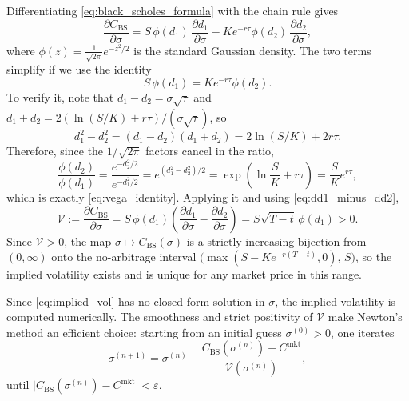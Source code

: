 Differentiating \eqref{eq:black_scholes_formula} with the chain rule gives
\begin{equation*}
    \frac{\partial C_{\mathrm{BS}}}{\partial \sigma}
        = S\,\phi(d_1)\,\frac{\partial d_1}{\partial \sigma}
          - K e^{-r\tau}\phi(d_2)\,\frac{\partial d_2}{\partial \sigma},
\end{equation*}
where $\phi(z) = \frac{1}{\sqrt{2\pi}}e^{-z^2/2}$ is the standard Gaussian density.
The two terms simplify if we use the identity
\begin{equation}\label{eq:vega_identity}
    S\,\phi(d_1) = K e^{-r\tau}\phi(d_2).
\end{equation}
To verify it, note that $d_1 - d_2 = \sigma\sqrt{\tau}$ and $d_1 + d_2 = 2(\ln(S/K) + r\tau)/(\sigma\sqrt{\tau})$,
so
\begin{equation*}
    d_1^2 - d_2^2 = (d_1 - d_2)(d_1 + d_2) = 2\ln(S/K) + 2r\tau.
\end{equation*}
Therefore, since the $1/\sqrt{2\pi}$ factors cancel in the ratio,
\begin{equation*}
    \frac{\phi(d_2)}{\phi(d_1)}
        = \frac{e^{-d_2^2/2}}{e^{-d_1^2/2}}
        = e^{(d_1^2 - d_2^2)/2}
        = \exp\!\left(\ln\frac{S}{K} + r\tau\right)
        = \frac{S}{K}e^{r\tau},
\end{equation*}
which is exactly \eqref{eq:vega_identity}.
Applying it and using \eqref{eq:dd1_minus_dd2},
\begin{equation}\label{eq:bs_vega}
    \mathcal{V} := \frac{\partial C_{\mathrm{BS}}}{\partial \sigma}
        = S\,\phi(d_1)
          \left(\frac{\partial d_1}{\partial \sigma} - \frac{\partial d_2}{\partial \sigma}\right)
        = S\sqrt{T - t}\,\phi(d_1) > 0.
\end{equation}
Since $\mathcal{V} > 0$, the map $\sigma \mapsto C_{\mathrm{BS}}(\sigma)$ is a strictly increasing bijection
from $(0, \infty)$ onto the no-arbitrage interval
$\bigl(\max(S - Ke^{-r(T-t)}, 0),\, S\bigr)$,
so the implied volatility exists and is unique for any market price in this range.

Since \eqref{eq:implied_vol} has no closed-form solution in $\sigma$,
the implied volatility is computed numerically.
The smoothness and strict positivity of $\mathcal{V}$ make Newton's method an efficient choice:
starting from an initial guess $\sigma^{(0)} > 0$, one iterates
\begin{equation}\label{eq:newton_iv}
    \sigma^{(n+1)} = \sigma^{(n)} - \frac{C_{\mathrm{BS}}(\sigma^{(n)}) - C^{\mathrm{mkt}}}{\mathcal{V}(\sigma^{(n)})},
\end{equation}
until $\lvert C_{\mathrm{BS}}(\sigma^{(n)}) - C^{\mathrm{mkt}}\rvert < \varepsilon$.

